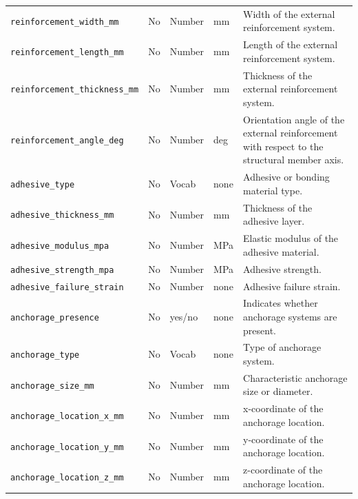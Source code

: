 \documentclass[11pt]{book}
\begin{document}
\begin{longtable}{p{}p{}p{}p{}p{}}
\texttt{reinforcement\_width\_mm} &
No &
Number &
mm &
Width of the external reinforcement system. \\

\texttt{reinforcement\_length\_mm} &
No &
Number &
mm &
Length of the external reinforcement system. \\

\texttt{reinforcement\_thickness\_mm} &
No &
Number &
mm &
Thickness of the external reinforcement system. \\

\texttt{reinforcement\_angle\_deg} &
No &
Number &
deg &
Orientation angle of the external reinforcement with respect to the structural member axis. \\

\texttt{adhesive\_type} &
No &
Vocab &
none &
Adhesive or bonding material type. \\

\texttt{adhesive\_thickness\_mm} &
No &
Number &
mm &
Thickness of the adhesive layer. \\

\texttt{adhesive\_modulus\_mpa} &
No &
Number &
MPa &
Elastic modulus of the adhesive material. \\

\texttt{adhesive\_strength\_mpa} &
No &
Number &
MPa &
Adhesive strength. \\

\texttt{adhesive\_failure\_strain} &
No &
Number &
none &
Adhesive failure strain. \\

\texttt{anchorage\_presence} &
No &
yes/no &
none &
Indicates whether anchorage systems are present. \\

\texttt{anchorage\_type} &
No &
Vocab &
none &
Type of anchorage system. \\

\texttt{anchorage\_size\_mm} &
No &
Number &
mm &
Characteristic anchorage size or diameter. \\

\texttt{anchorage\_location\_x\_mm} &
No &
Number &
mm &
x-coordinate of the anchorage location. \\

\texttt{anchorage\_location\_y\_mm} &
No &
Number &
mm &
y-coordinate of the anchorage location. \\

\texttt{anchorage\_location\_z\_mm} &
No &
Number &
mm &
z-coordinate of the anchorage location. \\


\end{longtable}
\end{document}
